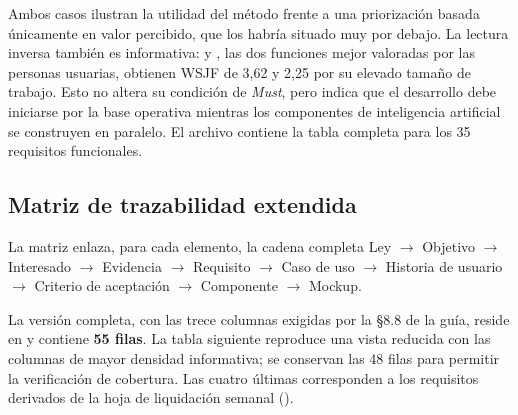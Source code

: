 Ambos casos ilustran la utilidad del método frente a una priorización basada únicamente en valor
percibido, que los habría situado muy por debajo. La lectura inversa también es informativa:
 y , las dos funciones mejor valoradas por las personas usuarias, obtienen WSJF
de 3,62 y 2,25 por su elevado tamaño de trabajo. Esto no altera su condición de \emph{Must}, pero
indica que el desarrollo debe iniciarse por la base operativa mientras los componentes de
inteligencia artificial se construyen en paralelo. El archivo
\allowbreak{} contiene la tabla completa para los 35
requisitos funcionales.

\subsection{Matriz de trazabilidad extendida}

La matriz enlaza, para cada elemento, la cadena completa
Ley $\rightarrow$ Objetivo $\rightarrow$ Interesado $\rightarrow$ Evidencia $\rightarrow$
Requisito $\rightarrow$ Caso de uso $\rightarrow$ Historia de usuario $\rightarrow$
Criterio de aceptación $\rightarrow$ Componente $\rightarrow$ Mockup.

La versión completa, con las trece columnas exigidas por la §8.8 de la guía, reside en
\allowbreak{} y contiene \textbf{55 filas}. La tabla siguiente
reproduce una vista reducida con las columnas de mayor densidad informativa; se conservan las 48
filas para permitir la verificación de cobertura. Las cuatro últimas corresponden a los requisitos derivados de la hoja de liquidación semanal ().

